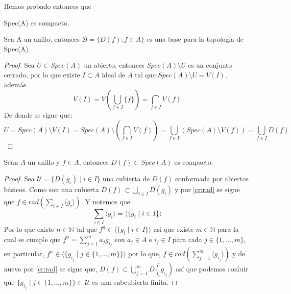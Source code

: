 \documentclass{article}
\begin{document}
Hemos probado entonces que 

\begin{corolario}{}{}
    Spec(A) es compacto.
\end{corolario}

\begin{proposicion}{}{}
    Sea A un anillo, entonces
    $\mathcal{B} = \{D(f); f\in A\}$
    es una base para la topología de Spec(A).
\end{proposicion}
\begin{proof}
    Sea $U \subset Spec(A)$ un abierto, entonces
    $Spec(A)\setminus U$ es un conjunto cerrado,
    por lo que existe $I \subset A$ ideal de $A$ tal que 
    $Spec(A)\setminus U = V(I)$, además.
    $$V(I)= V\left( \bigcup_{f\in I} \{f\}\right) = \bigcap_{f\in I}V(f)$$
    De donde se sigue que:
    $$U = Spec(A)\setminus V(I) 
    = Spec(A)\setminus\left( \bigcap_{f\in I}V(f)\right) 
    = \bigcup_{f\in I} (Spec(A)\setminus V(f))
    = \bigcup_{f \in I}D(f)$$
\end{proof}

\begin{proposicion}{}{}
    Sean $A$ un anillo y $f\in A$, entonces
    $D(f) \subset Spec(A)$ es compacto.
\end{proposicion}
\begin{proof}
    Sea $\mathcal{U}=\{D(g_i)\mid i\in I\}$ una cubierta
    de $D(f)$ conformada por abiertos básicos.
    Como son una cubierta $D(f) \subset \bigcup_{i \in I}D(g_i)$
    y por \ref{cr:rad} se sigue que
    $f\in rad\left(\sum_{i\in I}\langle g_i \rangle\right)$.
    Y notemos que
    $$\sum_{i\in I}\langle g_i \rangle
    = \langle \{g_i \mid i\in I \} \rangle$$
    Por lo que existe $n \in \mathbb{N}$ tal que
    $f^n \in \langle\{g_i\mid i\in I\} \rangle$ asi que
    existe $m \in \mathbb{N}$ para la cual se cumple que
    $f^n = \sum_{j=1}^{m} a_j g_{i_j}$ con $a_j \in A$
    e $i_j \in I$ para cada $j \in \{1,\dots,m\}$, en particular,
    $f^n \in \langle \{g_{i_j}\mid j\in \{1,\dots, m\} \} \rangle$
    por lo que, 
    $f \in rad \left( \sum_{j=1}^{m} \langle g_{i_j} \rangle\right)$
    y de nuevo por \ref{cr:rad} se sigue que, 
    $D(f) \subset \bigcup_{j=1}^m D(g_{i_j})$ así que podemos conluir
    que $\{g_{i_j}\mid j\in\{1,\dots,m\}\} \subset \mathcal{U}$ es una
    subcubierta finita.
\end{proof}
\end{document}
